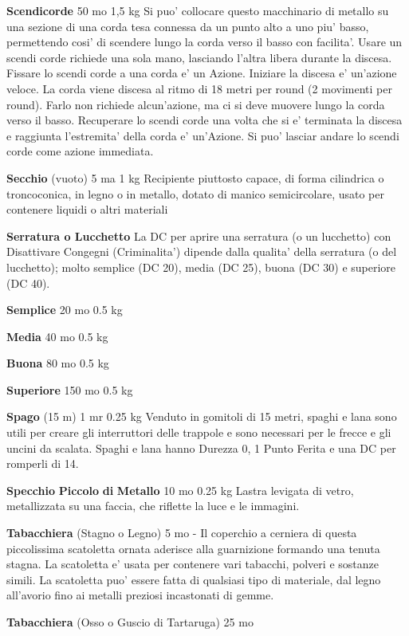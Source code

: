 \documentclass[a4paper,11pt,twoside,openany]{book}
\begin{document}
{\textbf{Scendicorde} 50 mo 1,5 kg Si puo' collocare questo macchinario di metallo su una sezione di una corda tesa connessa da un punto alto a uno piu' basso, permettendo cosi' di scendere lungo la corda verso il basso con facilita'. Usare un scendi corde richiede una sola mano, lasciando l'altra libera durante la discesa. Fissare lo scendi corde a una corda e' un Azione. Iniziare la discesa e' un'azione veloce. La corda viene discesa al ritmo di 18 metri per round (2 movimenti per round). Farlo non richiede alcun'azione, ma ci si deve muovere lungo la corda verso il basso. Recuperare lo scendi corde una volta che si e' terminata la discesa e raggiunta l'estremita' della corda e' un'Azione.
Si puo' lasciar andare lo scendi corde come azione immediata.

\textbf{Secchio} (vuoto) 5 ma 1 kg Recipiente piuttosto capace, di forma cilindrica o troncoconica, in legno o in metallo, dotato di manico semicircolare, usato per contenere liquidi o altri materiali

\textbf{Serratura o Lucchetto} La DC per aprire una serratura (o un lucchetto) con Disattivare Congegni (Criminalita') dipende dalla qualita' della serratura (o del lucchetto); molto semplice (DC 20), media (DC 25), buona (DC 30) e superiore (DC 40).

\textbf{Semplice} 20 mo 0.5 kg

\textbf{Media} 40 mo 0.5 kg

\textbf{Buona} 80 mo 0.5 kg

\textbf{Superiore} 150 mo 0.5 kg

\textbf{Spago} (15 m) 1 mr 0.25 kg Venduto in gomitoli di 15 metri, spaghi e lana sono utili per creare gli interruttori delle trappole e sono necessari per le frecce e gli uncini da scalata. Spaghi e lana hanno Durezza 0, 1 Punto Ferita e una DC per romperli di 14.

\textbf{Specchio} \textbf{Piccolo} \textbf{di} \textbf{Metallo} 10 mo 0.25 kg Lastra levigata di vetro, metallizzata su una faccia, che riflette la luce e le immagini.

\textbf{Tabacchiera} (Stagno o Legno) 5 mo - Il coperchio a cerniera di questa piccolissima scatoletta ornata aderisce alla guarnizione formando una tenuta stagna. La scatoletta e' usata per contenere vari tabacchi, polveri e sostanze simili. La scatoletta puo' essere fatta di qualsiasi tipo di materiale, dal legno all'avorio fino ai metalli preziosi incastonati di gemme.

\textbf{Tabacchiera} (Osso o Guscio di Tartaruga) 25 mo

}
\end{document}
